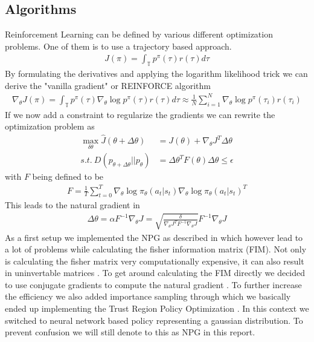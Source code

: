 \subsection{Algorithms}
\label{algos}
Reinforcement Learning can be defined by various different optimization problems. One of them is to use a trajectory based approach.
\begin{align}
  J(\pi) = \int_{\mathbb{T}} p^{\pi}(\tau) r(\tau) d\tau
\end{align}
By formulating the derivatives and applying the logarithm likelihood trick we can derive the "vanilla gradient" or REINFORCE algorithm
\begin{align}
  \nabla_{\theta} J(\pi) = \int_{\mathbb{T}} p^{\pi}(\tau) \nabla_{\theta} \log p^{\pi}(\tau) r(\tau) d\tau \approx \frac{1}{N} \sum_{i=1}^{N} \nabla_{\theta} \log p^{\pi}(\tau_i) r(\tau_i)
\end{align}
If we now add a constraint to regularize the gradients we can rewrite the optimization problem as
\begin{align}
  \max_{\delta\theta} \hat J(\theta + \Delta\theta) &= J(\theta) + \nabla_{\theta} J^T \Delta\theta \nonumber \\
  s.t. \ D(p_{\theta + \Delta\theta} || p_{\theta}) &= \Delta\theta^T F(\theta) \Delta\theta \leq \epsilon \label{NpgOpti}
\end{align}
with $F$ being defined to be
\begin{align}
  F = \frac{1}{T} \sum_{t=0}^{T} \nabla_{\theta} \log \pi_{\theta}(a_t | s_t)
  \nabla_{\theta} \log \pi_{\theta}(a_t | s_t)^T
\end{align}
This leads to the natural gradient in \cite{Rajeswaran2017}
\begin{align}
  \Delta \theta = \alpha F^{-1} \nabla_{\theta} J = \sqrt{\frac{\delta}{\nabla_{\theta} J^T F^{-1} \nabla_{\theta} J}} F^{-1} \nabla_{\theta} J
\end{align}
As a first setup we implemented the NPG as described in \cite{Rajeswaran2017} which however lead to a lot of problems while calculating the fisher information matrix (FIM). Not only is calculating the fisher matrix very computationally expensive, it can also result in uninvertable matrices \cite{DuanCHSA16}. To get around calculating the FIM directly we decided to use conjugate gradients to compute the natural gradient \cite{DuanCHSA16}. To further increase the efficiency we also added importance sampling through which we basically ended up implementing the Trust Region Policy Optimization \cite{SchulmanLMJA15,Telesens}. In this context we switched to neural network based policy representing a gaussian distribution. To prevent confusion we will still denote to this as NPG in this report.\\

